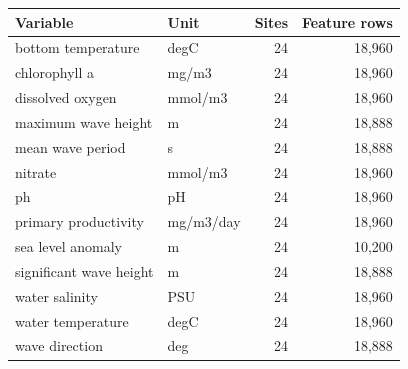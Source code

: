 \begin{tabular}{l l r r}
\toprule
Variable & Unit & Sites & Feature rows \\
\midrule
bottom temperature & degC & 24 & 18,960 \\
chlorophyll a & mg/m3 & 24 & 18,960 \\
dissolved oxygen & mmol/m3 & 24 & 18,960 \\
maximum wave height & m & 24 & 18,888 \\
mean wave period & s & 24 & 18,888 \\
nitrate & mmol/m3 & 24 & 18,960 \\
ph & pH & 24 & 18,960 \\
primary productivity & mg/m3/day & 24 & 18,960 \\
sea level anomaly & m & 24 & 10,200 \\
significant wave height & m & 24 & 18,888 \\
water salinity & PSU & 24 & 18,960 \\
water temperature & degC & 24 & 18,960 \\
wave direction & deg & 24 & 18,888 \\
\bottomrule
\end{tabular}